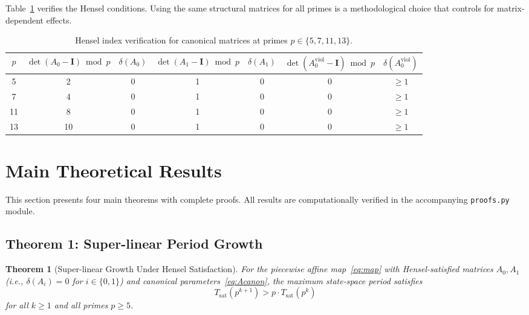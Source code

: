\documentclass[11pt]{article}
\theoremstyle{plain}
\newtheorem{theorem}{Theorem}[section]
\theoremstyle{definition}
\newcommand{\Id}{\mathbf{I}}
\begin{document}
Table~\ref{tab:hensel_check} verifies the Hensel conditions. Using the same structural matrices for all primes is a methodological choice that controls for matrix-dependent effects.

\begin{table}[ht]
\centering
\caption{Hensel index verification for canonical matrices at primes $p \in \{5,7,11,13\}$.}
\label{tab:hensel_check}
\medskip
\begin{tabular}{@{}ccccccc@{}}
\toprule
$p$ & $\det(A_0-\Id)\bmod p$ & $\delta(A_0)$ & $\det(A_1-\Id)\bmod p$ & $\delta(A_1)$ & $\det(A_0^{\mathrm{viol}}-\Id)\bmod p$ & $\delta(A_0^{\mathrm{viol}})$\\
\midrule
5  & 2  & 0 & 1  & 0 & 0 & $\geq 1$\\
7  & 4  & 0 & 1  & 0 & 0 & $\geq 1$\\
11 & 8  & 0 & 1  & 0 & 0 & $\geq 1$\\
13 & 10 & 0 & 1  & 0 & 0 & $\geq 1$\\
\bottomrule
\end{tabular}
\end{table}

\section{Main Theoretical Results}
\label{sec:theorems}

This section presents four main theorems with complete proofs. All results are computationally verified in the accompanying \texttt{proofs.py} module.

\subsection{Theorem 1: Super-linear Period Growth}

\begin{theorem}[Super-linear Growth Under Hensel Satisfaction]
\label{thm:superlinear}
For the piecewise affine map~\eqref{eq:map} with Hensel-satisfied matrices $A_0, A_1$ (i.e., $\delta(A_i) = 0$ for $i \in \{0,1\}$) and canonical parameters~\eqref{eq:Acanon}, the maximum state-space period satisfies
\begin{equation}
  T_{\mathrm{sat}}(p^{k+1}) > p \cdot T_{\mathrm{sat}}(p^k)
\end{equation}
for all $k \geq 1$ and all primes $p \geq 5$.
\end{theorem}
\end{document}
